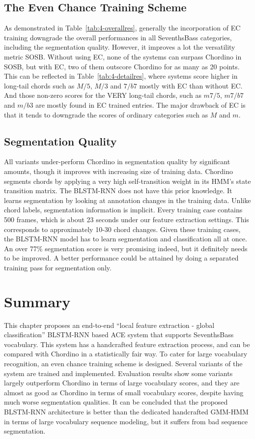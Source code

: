 \subsection{The Even Chance Training Scheme}
As demonstrated in Table~\ref{tab:4-overallres}, generally the incorporation of EC training downgrade the overall performances in all SeventhsBass categories, including the segmentation quality. However, it improves a lot the versatility metric SOSB. Without using EC, none of the systems can surpass Chordino in SOSB, but with EC, two of them outscore Chordino for as many as 20 points. This can be reflected in Table~\ref{tab:4-detailres}, where systems score higher in long-tail chords such as $M/5$, $M/3$ and $7/b7$ mostly with EC than without EC. And those non-zero scores for the VERY long-tail chords, such as $m7/5$, $m7/b7$ and $m/b3$ are mostly found in EC trained entries. The major drawback of EC is that it tends to downgrade the scores of ordinary categories such as $M$ and $m$.

\subsection{Segmentation Quality}
All variants under-perform Chordino in segmentation quality by significant amounts, though it improves with increasing size of training data. Chordino segments chords by applying a very high self-transition weight in its HMM's state transition matrix. The BLSTM-RNN does not have this prior knowledge. It learns segmentation by looking at annotation changes in the training data. Unlike chord labels, segmentation information is implicit. Every training case contains 500 frames, which is about 23 seconds under our feature extraction settings. This corresponds to approximately 10-30 chord changes. Given these training cases, the BLSTM-RNN model has to learn segmentation and classification all at once. An over 77\% segmentation score is very promising indeed, but it definitely needs to be improved. A better performance could be attained by doing a separated training pass for segmentation only.

\section{Summary}\label{sec:4-concln}
This chapter proposes an end-to-end ``local feature extraction - global classification'' BLSTM-RNN based ACE system that supports SeventhsBass vocabulary. This system has a handcrafted feature extraction process, and can be compared with Chordino in a statistically fair way. To cater for large vocabulary recognition, an even chance training scheme is designed. Several variants of the system are trained and implemented. Evaluation results show some variants largely outperform Chordino in terms of large vocabulary scores, and they are almost as good as Chordino in terms of small vocabulary scores, despite having much worse segmentation qualities. It can be concluded that the proposed BLSTM-RNN architecture is better than the dedicated handcrafted GMM-HMM in terms of large vocabulary sequence modeling, but it suffers from bad sequence segmentation.

